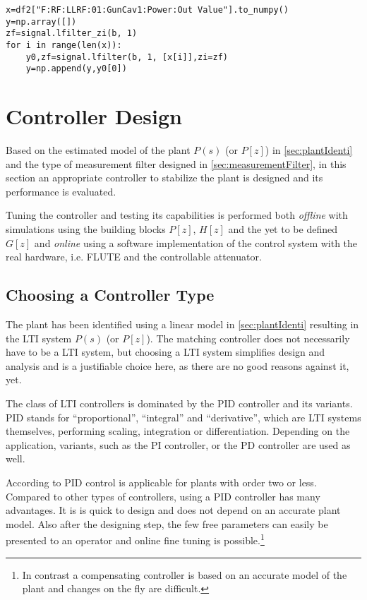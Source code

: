 \begin{lstlisting}[style=python,caption = Demonstration of the \texttt{zi} and \texttt{zf} variables when using \texttt{signal.lfilter()}, label = lst:controllerDesignAndEvaluation-zizf]
x=df2["F:RF:LLRF:01:GunCav1:Power:Out Value"].to_numpy()
y=np.array([])
zf=signal.lfilter_zi(b, 1)
for i in range(len(x)):
    y0,zf=signal.lfilter(b, 1, [x[i]],zi=zf)
    y=np.append(y,y0[0])
\end{lstlisting}











\newpage
\section{Controller Design}
Based on the estimated model of the plant $P(s)$ (or $P[z]$) in \autoref{sec:plantIdenti} and the type of measurement filter designed in \autoref{sec:measurementFilter}, in this section an appropriate controller to stabilize the plant is designed and its performance is evaluated.

Tuning the controller and testing its capabilities is performed both \textit{offline} with simulations using the building blocks $P[z]$, $H[z]$ and the yet to be defined $G[z]$ and \textit{online} using a software implementation of the control system with the real hardware, i.e. FLUTE and the controllable attenuator.

\subsection{Choosing a Controller Type}
The plant has been identified using a linear model in \autoref{sec:plantIdenti} resulting in the LTI system $P(s)$ (or $P[z]$). The matching controller does not necessarily have to be a LTI system, but choosing a LTI system simplifies design and analysis and is a justifiable choice here, as there are no good reasons against it, yet.

The class of LTI controllers is dominated by the PID controller and its variants. PID stands for ``proportional'', ``integral'' and ``derivative'', which are LTI systems themselves, performing scaling, integration or differentiation. Depending on the application, variants, such as the PI controller, or the PD controller are used as well.

According to \cite[p.~111]{Aastroem1995} PID control is applicable for plants with order two or less.
Compared to other types of controllers, using a PID controller has many advantages. It is is quick to design and does not depend on an accurate plant model. Also after the designing step, the few free parameters can easily be presented to an operator and online fine tuning is possible.\footnote{In contrast a compensating controller is based on an accurate model of the plant and changes on the fly are difficult.\cite{SergeZacher2010}}

